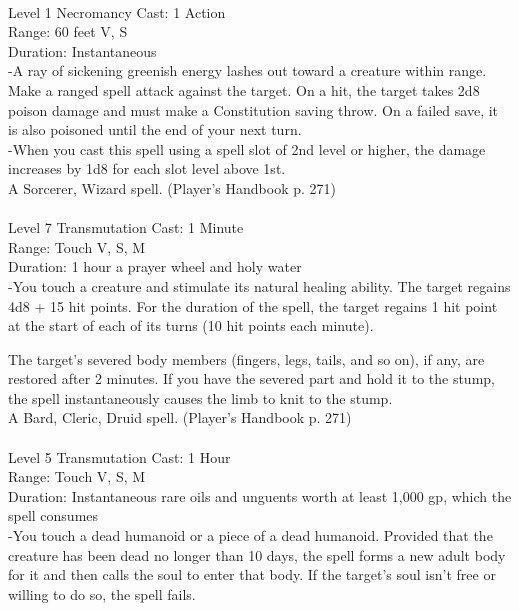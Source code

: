 \documentclass[10pt,twocolumn]{report}
\begin{document}
 \\
Level 1 \quad Necromancy \quad Cast: 1 Action\\
Range: 60 feet \quad V, S\\
Duration: Instantaneous \quad \\
-A ray of sickening greenish energy lashes out toward a creature within range.
Make a ranged spell attack against the target. On a hit, the target takes 2d8 poison damage and must make a Constitution saving throw. On a failed save, it is also poisoned until the end of your next turn.\\
-When you cast this spell using a spell slot of 2nd level or higher, the damage increases by 1d8 for each slot level above 1st.\\
A Sorcerer, Wizard spell. (Player's Handbook p. 271) \\


 \\
Level 7 \quad Transmutation \quad Cast: 1 Minute\\
Range: Touch \quad V, S, M\\
Duration: 1 hour \quad a prayer wheel and holy water\\
-You touch a creature and stimulate its natural healing ability.
The target regains 4d8 + 15 hit points. For the duration of the spell, the target regains 1 hit point at the start of each of its turns (10 hit points each minute).

The target’s severed body members (fingers, legs, tails, and so on), if any, are restored after 2 minutes. If you have the severed part and hold it to the stump, the spell instantaneously causes the limb to knit to the stump.\\
A Bard, Cleric, Druid spell. (Player's Handbook p. 271) \\


 \\
Level 5 \quad Transmutation \quad Cast: 1 Hour\\
Range: Touch \quad V, S, M\\
Duration: Instantaneous \quad rare oils and unguents worth at least 1,000 gp, which the spell consumes\\
-You touch a dead humanoid or a piece of a dead humanoid. Provided that the creature has been dead no longer than 10 days, the spell forms a new adult body for it and then calls the soul to enter that body. If the target’s soul isn’t free or willing to do so, the spell fails.
\end{document}
